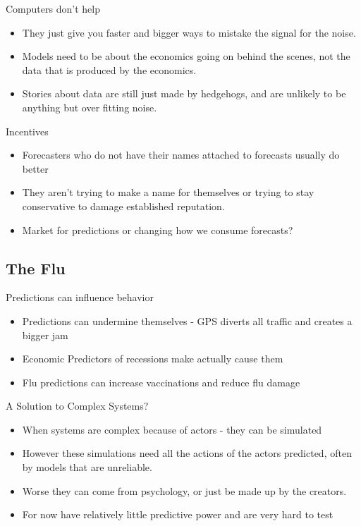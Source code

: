 \documentclass[bigger]{beamer}
\begin{document}
\begin{frame}[label=sec-3-2-6]{Computers don't help}
\begin{itemize}
\item They just give you faster and bigger ways to mistake the signal for
the noise.
\item Models need to be about the economics going on behind the scenes,
not the data that is produced by the economics.
\item Stories about data are still just made by hedgehogs, and are
unlikely to be anything but over fitting noise.
\end{itemize}
\end{frame}

\begin{frame}[label=sec-3-2-7]{Incentives}
\begin{itemize}
\item Forecasters who do not have their names attached to forecasts
usually do better
\item They aren't trying to make a name for themselves or trying to stay
conservative to damage established reputation.
\item Market for predictions or changing how we consume forecasts?
\end{itemize}
\end{frame}

\subsection{The Flu}
\label{sec-3-3}
\begin{frame}[label=sec-3-3-1]{Predictions can influence behavior}
\begin{itemize}
\item Predictions can undermine themselves - GPS diverts all traffic and
creates a bigger jam
\item Economic Predictors of recessions make actually cause them
\item Flu predictions can increase vaccinations and reduce flu damage
\end{itemize}
\end{frame}

\begin{frame}[label=sec-3-3-2]{A Solution to Complex Systems?}
\begin{itemize}
\item When systems are complex because of actors - they can be simulated
\item However these simulations need all the actions of the actors
predicted, often by models that are unreliable.
\item Worse they can come from psychology, or just be made up by the
creators.
\item For now have relatively little predictive power and are very hard to
test
\end{itemize}
\end{frame}
\end{document}
